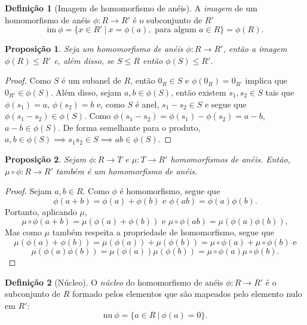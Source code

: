 \documentclass[a4paper,12pt]{report}
\theoremstyle{plain}
\newtheorem{proposicao}{Proposição}[section]
\theoremstyle{definition}
\newtheorem{definicao}{Definição}[section]
\begin{document}
	\begin{definicao}[Imagem de homomorfismo de anéis]
		A \emph{imagem} de um homomorfismo de anéis
		\(\phi: R\longrightarrow R'\) é o subconjunto de \(R'\)	\[\text{im}\ \phi = \{x\in R' \ |\ x = \phi(a), \text{ para algum } a\in R\} = \phi(R).\]
	\end{definicao}
	
	\begin{proposicao}
		Seja um homomorfismo de anéis $\phi: R \longrightarrow R'$, então a imagem $\phi(R) \leq R'$ e, além disso, se $S\leq R$ então $\phi(S) \leq R'$.
	\end{proposicao}
	
	\begin{proof}
		Como $S$ é um subanel de $R$, então $0_R\in S$ e $\phi(0_R) = 0_{R'}$ implica que $0_{R'} \in \phi(S)$. Além disso, sejam $a,b\in \phi(S)$, então existem $s_1,s_2 \in S$ tais que $\phi(s_1) = a$, $\phi(s_2) = b$ e, como $S$ é anel, $s_1 - s_2 \in S$ e segue que $\phi(s_1 - s_2) \in \phi(S)$. Como $\phi(s_1 - s_2) = \phi(s_1) - \phi(s_2) = a - b$, $a-b\in \phi(S)$. De forma semelhante para o produto, $a,b \in \phi(S) \implies s_1s_2 \in S \implies ab \in \phi(S)$.
	\end{proof}
	
	\begin{proposicao}
		Sejam $\phi: R \longrightarrow T$ e $\mu: T\longrightarrow R'$ homomorfismos de anéis. Então, $\mu\circ\phi: R\longrightarrow R'$ também é um homomorfismo de anéis.	
	\end{proposicao}
	\begin{proof}
		Sejam $a,b \in R$. Como $\phi$ é homomorfismo, segue que $$\phi(a+b) = \phi(a) + \phi(b) \text{ e } \phi(ab) = \phi(a)\phi(b).$$
		Portanto, aplicando $\mu$,
		$$\mu\circ\phi(a+b) = \mu(\phi(a) + \phi(b)) \text{ e } \mu\circ\phi(ab) = \mu(\phi(a)\phi(b)),$$
		Mas como $\mu$ também respeita a propriedade de homomorfismo, segue que
		$$\mu(\phi(a) + \phi(b)) = \mu(\phi(a)) + \mu(\phi(b)) = \mu\circ\phi(a) + \mu\circ\phi(b)\text{ e}$$
		$$\mu(\phi(a)\phi(b)) = \mu(\phi(a))\mu(\phi(b)) = \mu\circ\phi(a)\mu\circ\phi(b).$$
	\end{proof}
	
	\begin{definicao}[Núcleo]
		O \emph{núcleo} do homomorfismo de anéis $\phi: R \longrightarrow R'$ é o subconjunto de $R$ formado pelos elementos que são mapeados pelo elemento nulo em
		$R'$: $$\text{nu} \ \phi = \{a \in R \ | \ \phi(a) = 0\}.$$
	\end{definicao}
	
\end{document}
